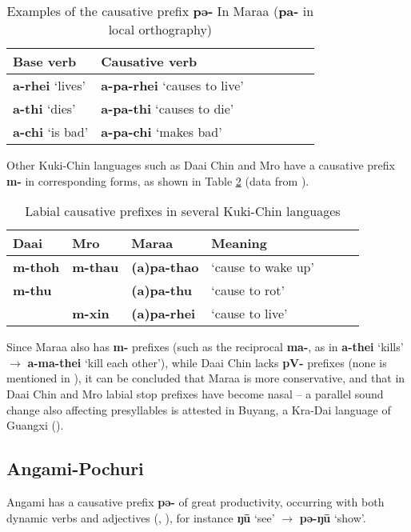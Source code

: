 \documentclass[oneside,a4paper,11pt]{article}
\newcommand{\ipa}[1]{\textbf{{\phon\mbox{#1}}}} %
\newcommand{\forme}[2]{\ipa{#1} `#2'}
\begin{document}
\begin{table}[H]
\caption{Examples of the causative prefix \ipa{pə-} In Maraa (\ipa{pa-} in local orthography)} \centering \label{tab:maraa}
\begin{tabular}{lllllll}
\toprule
Base verb & Causative verb \\
\midrule
\forme{a-rhei}{lives} & \forme{a-pa-rhei}{causes to live} \\
\forme{a-thi}{dies} & \forme{a-pa-thi}{causes to die} \\
\forme{a-chi}{is bad} & \forme{a-pa-chi}{makes bad} \\
\bottomrule
\end{tabular}
\end{table}

Other Kuki-Chin languages such as Daai Chin and Mro have a causative prefix \ipa{m-} in corresponding forms, as shown in Table \ref{tab:kukichin}  (data from \citealt[139]{hartmann01prenasalization}).

\begin{table}[H]
\caption{Labial causative prefixes in several Kuki-Chin languages} \centering \label{tab:kukichin}
\begin{tabular}{lllllll}
\toprule
Daai & Mro & Maraa & Meaning \\
\midrule
\ipa{m-thoh}  &\ipa{m-thau}  & \ipa{(a)pa-thao} & `cause to wake up' \\
\ipa{m-thu}  &  & \ipa{(a)pa-thu} & `cause to rot' \\
&\ipa{m-xin}  & \ipa{(a)pa-rhei} & `cause to live' \\
\bottomrule
\end{tabular}
\end{table}

Since Maraa also has \ipa{m-} prefixes (such as the reciprocal \ipa{ma-}, as in \forme{a-thei}{kills} $\rightarrow$ \forme{a-ma-thei}{kill each other}), while Daai Chin lacks \ipa{pV-} prefixes (none is mentioned in \citealt{hartmann09grammar}), it can be concluded that Maraa is more conservative, and that in Daai Chin and Mro labial stop prefixes have become nasal -- a parallel sound change also affecting presyllables is attested in Buyang, a Kra-Dai language of Guangxi (\citealt{jacques17buyang}). 

\subsection{Angami-Pochuri}
Angami has a causative prefix \ipa{pə-} of great productivity, occurring with both dynamic verbs and adjectives (\citealt[132-3]{matisoff03}, \citealt[66-67]{giridhar80angami}), for instance \forme{ŋū}{see} $\rightarrow$ \forme{pə-ŋū}{show}.
\end{document}
